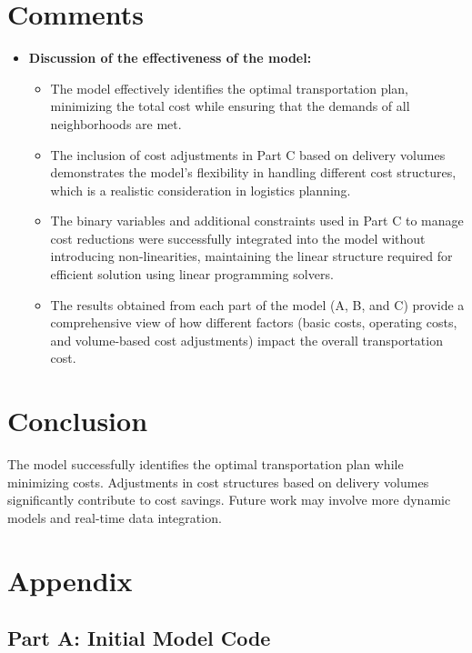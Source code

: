 \documentclass[12pt]{article}
\begin{document}
\section*{Comments}
\begin{itemize}
    \item \textbf{Discussion of the effectiveness of the model:}
    \begin{itemize}
        \item The model effectively identifies the optimal transportation plan, minimizing the total cost while ensuring that the demands of all neighborhoods are met.
        \item The inclusion of cost adjustments in Part C based on delivery volumes demonstrates the model's flexibility in handling different cost structures, which is a realistic consideration in logistics planning.
        \item The binary variables and additional constraints used in Part C to manage cost reductions were successfully integrated into the model without introducing non-linearities, maintaining the linear structure required for efficient solution using linear programming solvers.
        \item The results obtained from each part of the model (A, B, and C) provide a comprehensive view of how different factors (basic costs, operating costs, and volume-based cost adjustments) impact the overall transportation cost.
    \end{itemize}
    
\end{itemize}
\section*{Conclusion}
The model successfully identifies the optimal transportation plan while minimizing costs. Adjustments in cost structures based on delivery volumes significantly contribute to cost savings. Future work may involve more dynamic models and real-time data integration.

\newpage
\appendix
\section*{Appendix}

\subsection{Part A: Initial Model Code}


\end{document}
